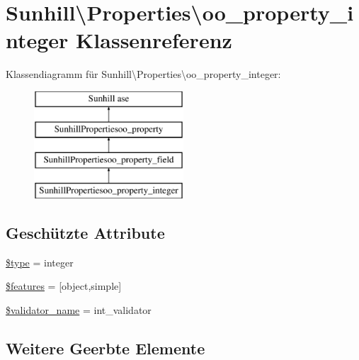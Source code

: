 \hypertarget{classSunhill_1_1Properties_1_1oo__property__integer}{}\section{Sunhill\textbackslash{}Properties\textbackslash{}oo\+\_\+property\+\_\+integer Klassenreferenz}
\label{classSunhill_1_1Properties_1_1oo__property__integer}
Klassendiagramm für Sunhill\textbackslash{}Properties\textbackslash{}oo\+\_\+property\+\_\+integer\+:\begin{figure}[H]
\begin{center}
\leavevmode
\includegraphics[height=4.000000cm]{da/d18/classSunhill_1_1Properties_1_1oo__property__integer}
\end{center}
\end{figure}
\subsection*{Geschützte Attribute}
\begin{DoxyCompactItemize}
\item 
\hyperlink{classSunhill_1_1Properties_1_1oo__property__integer_a0018a3a9328276b8b25882996b0379b4}{\$type} = \textquotesingle{}integer\textquotesingle{}
\item 
\hyperlink{classSunhill_1_1Properties_1_1oo__property__integer_a367a30acaf495c2dd8e08f802569f0e0}{\$features} = \mbox{[}\textquotesingle{}object\textquotesingle{},\textquotesingle{}simple\textquotesingle{}\mbox{]}
\item 
\hyperlink{classSunhill_1_1Properties_1_1oo__property__integer_ab94aac9b2f17532c7b87a238479d0a73}{\$validator\+\_\+name} = \textquotesingle{}int\+\_\+validator\textquotesingle{}
\end{DoxyCompactItemize}
\subsection*{Weitere Geerbte Elemente}



